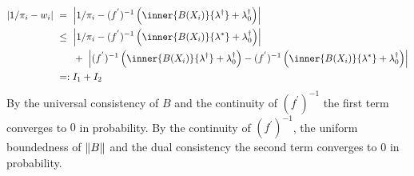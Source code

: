  \begin{align*}
   \left| 
   1 / \pi_i
   -
   w_i
   \right|
   & 
   \ 
   =
   \ 
   \left| 
   1 / \pi_i
   -
   (
      f ^ { ' }
   )
   ^ {-1}
   \left( 
   \inner
   { B(X_i)}
   { \lambda ^ \dagger }
   +
   \lambda^\dagger_0
   \right)
   \right|
   \\
   & 
   \ 
   \le
   \ 
   \left| 
   1 / \pi_i
   -
   (
      f ^ { ' }
   )
   ^ {-1}
   \left( 
   \inner
   { B(X_i)}
   { \lambda ^ * }
   +
   \lambda^\dagger_0
   \right)
   \right|
   \\
   &
   \qquad
   +
   \ 
\left| 
   (
      f ^ { ' }
   )
   ^ {-1}
   \left( 
   \inner
   { B(X_i)}
   { \lambda ^ \dagger }
   +
   \lambda^\dagger_0
   \right)
   -
   (
      f ^ { ' }
   )
   ^ {-1}
   \left( 
   \inner
   { B(X_i)}
   { \lambda ^ *}
   +
   \lambda^\dagger_0
   \right)
   \right|
   \\
   &
   \ 
   =:
   I_1 +
   I_2
 \end{align*}
 By the universal consistency of $B$ and the continuity of $(f^{'})^{-1}$ the first term converges to $0$ in probability.
 By the continuity of $(f^{'})^{-1}$,
 the uniform boundedness of $\left\lVert B\right\rVert$ and the dual consistency
 the second term converges to $0$ in probability.

